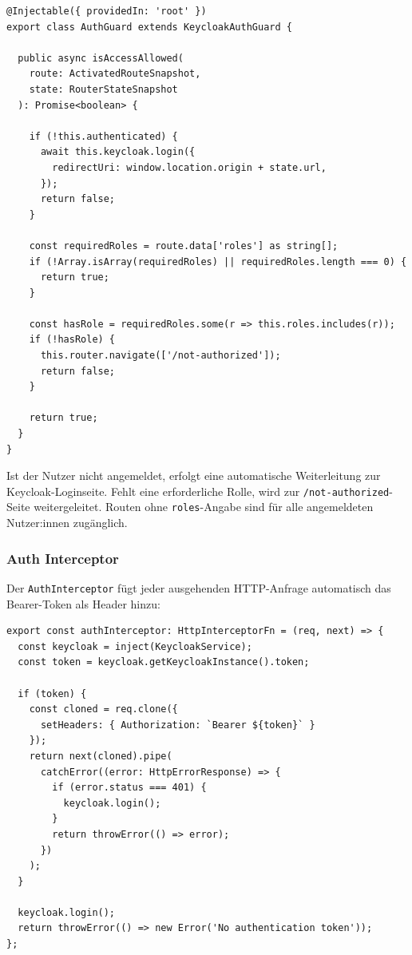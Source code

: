 \begin{lstlisting}[style=tsstyle,
                   caption={AuthGuard (auth.guard.ts)},
                   label={lst:auth-guard}]
@Injectable({ providedIn: 'root' })
export class AuthGuard extends KeycloakAuthGuard {

  public async isAccessAllowed(
    route: ActivatedRouteSnapshot,
    state: RouterStateSnapshot
  ): Promise<boolean> {

    if (!this.authenticated) {
      await this.keycloak.login({
        redirectUri: window.location.origin + state.url,
      });
      return false;
    }

    const requiredRoles = route.data['roles'] as string[];
    if (!Array.isArray(requiredRoles) || requiredRoles.length === 0) {
      return true;
    }

    const hasRole = requiredRoles.some(r => this.roles.includes(r));
    if (!hasRole) {
      this.router.navigate(['/not-authorized']);
      return false;
    }

    return true;
  }
}
\end{lstlisting}

Ist der Nutzer nicht angemeldet, erfolgt eine automatische
Weiterleitung zur Keycloak-Loginseite. Fehlt eine erforderliche Rolle,
wird zur \texttt{/not-authorized}-Seite weitergeleitet. Routen ohne
\texttt{roles}-Angabe sind für alle angemeldeten Nutzer:innen
zugänglich.

\subsubsection{Auth Interceptor}

Der \texttt{AuthInterceptor} fügt jeder ausgehenden HTTP-Anfrage
automatisch das Bearer-Token als Header hinzu:

\begin{lstlisting}[style=tsstyle,
                   caption={Auth Interceptor (auth.interceptor.ts)},
                   label={lst:auth-interceptor}]
export const authInterceptor: HttpInterceptorFn = (req, next) => {
  const keycloak = inject(KeycloakService);
  const token = keycloak.getKeycloakInstance().token;

  if (token) {
    const cloned = req.clone({
      setHeaders: { Authorization: `Bearer ${token}` }
    });
    return next(cloned).pipe(
      catchError((error: HttpErrorResponse) => {
        if (error.status === 401) {
          keycloak.login();
        }
        return throwError(() => error);
      })
    );
  }

  keycloak.login();
  return throwError(() => new Error('No authentication token'));
};
\end{lstlisting}

